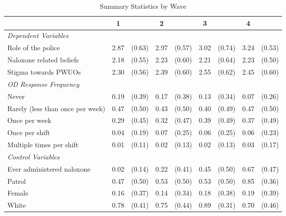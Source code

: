 \begin{table}[htbp]\centering
\def\sym#1{\ifmmode^{#1}\else\(^{#1}\)\fi}
\caption{\centering Summary Statistics by Wave}
\begin{tabular}{l*{4}{cc}}
\toprule
                &        1&         &        2&         &        3&         &        4&         \\
\midrule
\emph{Dependent Variables}&         &         &         &         &         &         &         &         \\
Role of the police&     2.87&   (0.63)&     2.97&   (0.57)&     3.02&   (0.74)&     3.24&   (0.53)\\
Naloxone related beliefs&     2.18&   (0.55)&     2.23&   (0.60)&     2.21&   (0.64)&     2.23&   (0.50)\\
Stigma towards PWUOs&     2.30&   (0.56)&     2.39&   (0.60)&     2.55&   (0.62)&     2.45&   (0.60)\\
\emph{OD Response Frequency}&         &         &         &         &         &         &         &         \\
Never           &     0.19&   (0.39)&     0.17&   (0.38)&     0.13&   (0.34)&     0.07&   (0.26)\\
Rarely (less than once per week)&     0.47&   (0.50)&     0.43&   (0.50)&     0.40&   (0.49)&     0.47&   (0.50)\\
Once per week   &     0.29&   (0.45)&     0.32&   (0.47)&     0.39&   (0.49)&     0.37&   (0.49)\\
Once per shift  &     0.04&   (0.19)&     0.07&   (0.25)&     0.06&   (0.25)&     0.06&   (0.23)\\
Multiple times per shift&     0.01&   (0.11)&     0.02&   (0.13)&     0.02&   (0.13)&     0.03&   (0.17)\\
\vspace{0.1em} \emph{Control Variables}&         &         &         &         &         &         &         &         \\
Ever administered naloxone&     0.02&   (0.14)&     0.22&   (0.41)&     0.45&   (0.50)&     0.67&   (0.47)\\
Patrol          &     0.47&   (0.50)&     0.53&   (0.50)&     0.53&   (0.50)&     0.85&   (0.36)\\
Female          &     0.16&   (0.37)&     0.14&   (0.34)&     0.18&   (0.38)&     0.19&   (0.39)\\
White           &     0.78&   (0.41)&     0.75&   (0.44)&     0.89&   (0.31)&     0.70&   (0.46)\\

\end{tabular}
\end{table}
